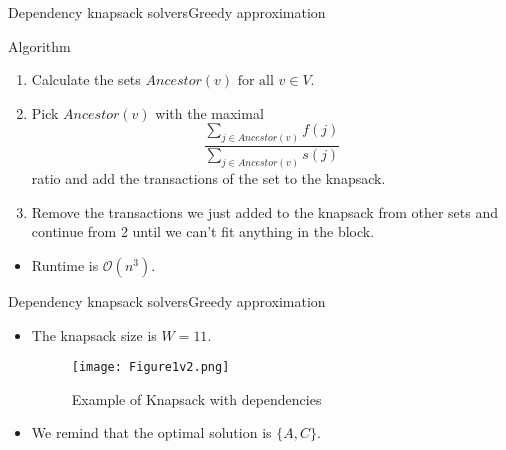 \documentclass{beamer}
\begin{document}
\begin{frame}{Dependency knapsack solvers}{Greedy approximation} %
    \begin{block} {Algorithm}
        \begin{enumerate}
            \item {Calculate the sets $Ancestor(v) \text{ for all } v\in 
            V$.}
            \item {Pick $Ancestor(v)$ with the maximal
             $$\frac{\sum_{j\in Ancestor(v)} f(j)}{\sum_{j\in Ancestor(v)}
              s(j)} $$ ratio and add the transactions of the set to the
               knapsack. }
            \item {Remove the transactions we just added to the knapsack 
            from other sets and continue from 2 until we can't fit 
            anything in the block.}
        \end{enumerate}
    \end{block}
    \begin{itemize}
        \item {Runtime is $\mathcal{O} (n^3)$.}
    \end{itemize}
\end{frame}

\begin{frame}{Dependency knapsack solvers}{Greedy approximation} %
    \begin{example}
    \begin{itemize}
        \item {The knapsack size is $W=11$.}
        \begin{figure}
            \centering
            \texttt{[image: Figure1v2.png]}
            \caption{Example of Knapsack with dependencies}
        \end{figure}
        \item {We remind that the optimal solution is $\{A,C\}$.}
    \end{itemize}
    \end{example}
\end{frame}
\end{document}
